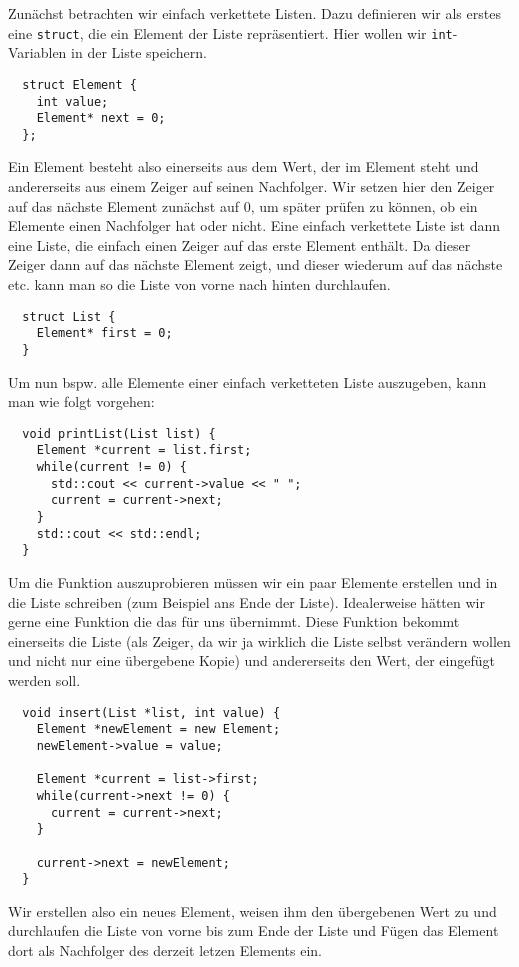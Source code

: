 \documentclass[
fontsize = 11pt,
paper    = a4,
BCOR     = 5mm,
DIV      = 12,
numbers  = noenddot,
]{scrartcl}
\begin{document}
Zunächst betrachten wir einfach verkettete Listen. Dazu definieren wir
als erstes eine \lstinline{struct}, die ein Element der Liste
repräsentiert. Hier wollen wir \lstinline{int}-Variablen in der Liste
speichern.
\begin{lstlisting}
  struct Element {
    int value;
    Element* next = 0;
  };
\end{lstlisting}
Ein Element besteht also einerseits aus dem Wert, der im Element steht
und andererseits aus einem Zeiger auf seinen Nachfolger. Wir setzen
hier den Zeiger auf das nächste Element zunächst auf 0, um später
prüfen zu können, ob ein Elemente einen Nachfolger hat oder
nicht. Eine einfach verkettete Liste ist dann eine Liste, die einfach
einen Zeiger auf das erste Element enthält. Da dieser Zeiger dann auf
das nächste Element zeigt, und dieser wiederum auf das nächste
etc. kann man so die Liste von vorne nach hinten durchlaufen.
\begin{lstlisting}
  struct List {
    Element* first = 0;
  }
\end{lstlisting}
Um nun bspw. alle Elemente einer einfach verketteten Liste auszugeben,
kann man wie folgt vorgehen:
\begin{lstlisting}
  void printList(List list) {
    Element *current = list.first;
    while(current != 0) {
      std::cout << current->value << " ";
      current = current->next;
    }
    std::cout << std::endl;
  }
\end{lstlisting}
Um die Funktion auszuprobieren müssen wir ein paar Elemente erstellen
und in die Liste schreiben (zum Beispiel ans Ende der
Liste). Idealerweise hätten wir gerne eine Funktion die das für uns
übernimmt. Diese Funktion bekommt einerseits die Liste (als Zeiger, da
wir ja wirklich die Liste selbst verändern wollen und nicht nur eine
übergebene Kopie) und andererseits den Wert, der eingefügt werden
soll.
\begin{lstlisting}
  void insert(List *list, int value) {
    Element *newElement = new Element;
    newElement->value = value;

    Element *current = list->first;
    while(current->next != 0) {
      current = current->next;
    }

    current->next = newElement;
  }
\end{lstlisting}
Wir erstellen also ein neues Element, weisen ihm den übergebenen Wert
zu und durchlaufen die Liste von vorne bis zum Ende der Liste und
Fügen das Element dort als Nachfolger des derzeit letzen Elements ein.
\end{document}
